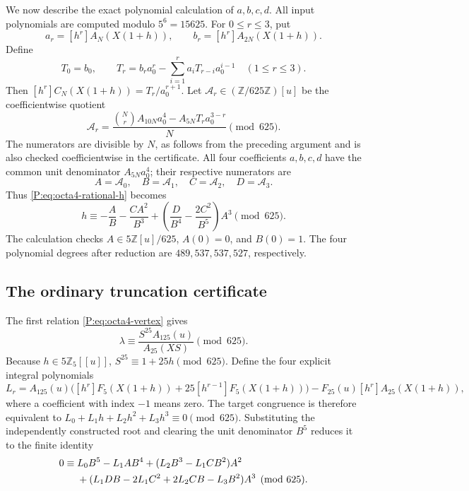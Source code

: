 \documentclass[11pt,a4paper]{article}
\theoremstyle{definition}\newtheorem{definition}[theorem]{Definition}
\theoremstyle{remark}\newtheorem{remark}[theorem]{Remark}
\numberwithin{equation}{section}
\begin{document}
We now describe the exact polynomial calculation of \(a,b,c,d\).
All input polynomials are computed modulo \(5^6=15625\).
For \(0\leq r\leq3\), put
\[
 a_r=[h^r]A_N(X(1+h)),\qquad
 b_r=[h^r]A_{2N}(X(1+h)).
\]
Define
\[
 T_0=b_0,\qquad
 T_r=b_r a_0^r-\sum_{i=1}^r a_iT_{r-i}a_0^{i-1}
       \quad(1\leq r\leq3).
\]
Then \([h^r]C_N(X(1+h))=T_r/a_0^{r+1}\).
Let \(\mathcal A_r\in(\mathbb Z/625\mathbb Z)[u]\) be the
coefficientwise quotient
\begin{equation}\label{P:eq:octa4-ABCD}
 \mathcal A_r=
 \frac{\binom Nr A_{10N}a_0^4
       -A_{5N}T_r a_0^{3-r}}{N}\pmod{625}.
\end{equation}
The numerators are divisible by \(N\), as follows from the
preceding argument and is also checked coefficientwise in the
certificate.  All four coefficients \(a,b,c,d\) have the common
unit denominator \(A_{5N}a_0^4\); their respective numerators
are
\[
 A=\mathcal A_0,\quad B=\mathcal A_1,\quad
 C=\mathcal A_2,\quad D=\mathcal A_3.
\]
Thus \eqref{P:eq:octa4-rational-h} becomes
\[
 h\equiv-\frac AB-\frac{CA^2}{B^3}
       +\left(\frac D{B^4}-\frac{2C^2}{B^5}\right)A^3
       \pmod{625}.
\]
The calculation checks \(A\in5\mathbb Z[u]/625\), \(A(0)=0\),
and \(B(0)=1\).  The four polynomial degrees after reduction
are \(489,537,537,527\), respectively.

\subsection{The ordinary truncation certificate}

The first relation \eqref{P:eq:octa4-vertex} gives
\[
 \lambda\equiv\frac{S^{25}A_{125}(u)}{A_{25}(XS)}\pmod{625}.
\]
Because \(h\in5\mathbb Z_5[[u]]\),
\(S^{25}\equiv1+25h\pmod{625}\).
Define the four explicit integral polynomials
\[
 L_r=A_{125}(u)\bigl([h^r]F_5(X(1+h))
                 +25[h^{r-1}]F_5(X(1+h))\bigr)
        -F_{25}(u)[h^r]A_{25}(X(1+h)),
\]
where a coefficient with index \(-1\) means zero.
The target congruence is therefore equivalent to
\(L_0+L_1h+L_2h^2+L_3h^3\equiv0\pmod{625}\).
Substituting the independently constructed root and clearing
the unit denominator \(B^5\) reduces it to the finite identity
\begin{align}
0\equiv{}&L_0B^5-L_1AB^4
 +(L_2B^3-L_1CB^2)A^2\notag\\
 &+(L_1DB-2L_1C^2+2L_2CB-L_3B^2)A^3
 \pmod{625}.\label{P:eq:octa4-final-certificate}
\end{align}
\end{document}
